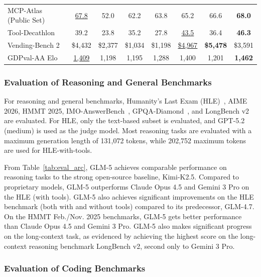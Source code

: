 \begin{table}[htbp]
\begin{tabular}{lccccccc}
MCP-Atlas (Public Set) & \underline{67.8} & 52.0 & 62.2 & 63.8 & 65.2 & 66.6 & \textbf{68.0} \\
Tool-Decathlon & 39.2 & 23.8 & 35.2 & 27.8 & \underline{43.5} & 36.4 & \textbf{46.3} \\
Vending-Bench 2 & \$4,432 & \$2,377 & \$1,034 & \$1,198 & \underline{\$4,967} & \textbf{\$5,478} & \$3,591 \\
GDPval-AA Elo & \underline{1,409} & 1,198 & 1,195 & 1,288 & 1,400 & 1,201 & \textbf{1,462} \\
\bottomrule
\end{tabular}
\end{table}




\subsubsection{Evaluation of Reasoning and General Benchmarks}

For reasoning and general benchmarks, 
Humanity’s Last Exam (HLE)~\cite{phan2025humanity}, AIME 2026, HMMT 2025, IMO-AnswerBench~\cite{luong2025towards},  GPQA-Diamond~\cite{rein2024gpqa}, and LongBench v2~\cite{bai-etal-2025-longbench} are evaluated. 
For HLE, only the text-based subset is evaluated, and GPT-5.2 (medium) is used as the judge model. Most reasoning tasks are evaluated with a maximum generation length of 131,072 tokens, while 202,752 maximum tokens are used for HLE-with-tools. 

From Table~\ref{tab:eval_arc}, GLM-5 achieves comparable performance on reasoning tasks to the strong open-source baseline, Kimi-K2.5.  
Compared to proprietary models, GLM-5 outperforms Claude Opus 4.5 and Gemini 3 Pro on the HLE (with tools). 
GLM-5 also achieves significant improvements on the HLE benchmark (both with and without tools) compared to its predecessor, GLM-4.7. 
On the HMMT Feb./Nov. 2025 benchmarks, GLM-5 gets better performance than Claude Opus 4.5 and Gemini 3 Pro. 
GLM-5 also makes significant progress on the long-context task, as evidenced by achieving the highest score on the long-context reasoning benchmark LongBench v2, second only to Gemini 3 Pro.


\subsubsection{Evaluation of Coding Benchmarks}

